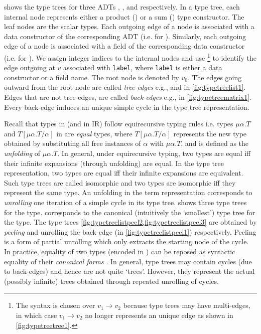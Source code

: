  shows the type trees for three ADTs , , and  respectively.
In a type tree, each internal node represents either a product (\prodn{}) or a sum (\sumn{}) type constructor.
The leaf nodes are the scalar types.
Each outgoing edge of a \sumn{} node is associated with a data constructor of the corresponding ADT (i.e.  for ).
Similarly, each outgoing edge of a \prodn{} node is associated with a field of the corresponding data constructor (i.e.  for ).
We assign integer indices to the internal nodes and use \footnote{
The  syntax is chosen over $v_1 \rightarrow v_2$ because type trees may have multi-edges, in which case
$v_1 \rightarrow v_2$ no longer represents an unique edge as shown in \cref{fig:typetreetree1}.} to identify the edge outgoing at $v$ associated with {\tt label},
where {\tt label} is either a data constructor or a field name.
The root node is denoted by $v_0$.
The edges going outward from the root node are called {\em tree-edges} e.g.,  and  in \cref{fig:typetreelist1}.
Edges that are not tree-edges, are called {\em back-edges} e.g.,  in \cref{fig:typetreematrix1}.
Every back-edge induces an unique simple cycle in the type tree representation.



Recall that types in \SpecL{} (and in IR) follow equirecursive typing rules i.e. types
$\mu \alpha. T$ and $T[\mu \alpha. T/\alpha]$ in \typegrammar{} are {\em equal} types,
where $T[\mu \alpha. T/\alpha]$ represents the new type obtained by substituting all free
instances of $\alpha$ with $\mu \alpha. T$, and is defined as the {\em unfolding} of $\mu \alpha. T$.
In general, under equirecursive typing, two types are equal iff their infinite expansions (through unfolding) are equal.
In the type tree representation, two types are equal iff their infinite expansions are equivalent.
Such type trees are called isomorphic and two types are isomorphic iff they represent the same type.
An unfolding in the term representation corresponds to {\em unrolling} one iteration of a simple cycle in its type tree.
 shows three type trees for the  type.
 corresponds to the canonical (intuitively the `smallest') type tree for the  type.
The type trees \cref{fig:typetreelistpeel2,fig:typetreelistpeel3} are obtained by {\em peeling} and unrolling
the back-edge  (in \cref{fig:typetreelistpeel1}) respectively.
Peeling is a form of partial unrolling which only extracts the starting node of the cycle.
In practice, equality of two types (encoded in \typegrammar{}) can be reposed as syntactic
equality of their {\em canonical forms} \cite{canonicalrecursivetypes}.
In general, type trees may contain cycles (due to back-edges) and hence are not quite `trees'.
However, they represent the actual (possibly infinite) trees obtained through repeated unrolling of cycles.

